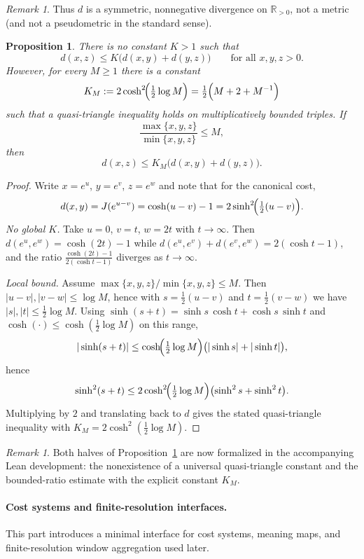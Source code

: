 \documentclass[11pt,reqno]{amsart}
\theoremstyle{plain}
\newtheorem{proposition}[theorem]{Proposition}
\theoremstyle{definition}
\theoremstyle{remark}
\newtheorem{remark}[theorem]{Remark} %
\newcommand{\Jcost}{J}
\newcommand{\RR}{\mathbb{R}}
\newcommand{\1}{\mathbf{1}}
\newcommand{\paperadd}[1]{{\color{paperblue}#1}}
\begin{document}
\begin{remark}
Thus $d$ is a symmetric, nonnegative divergence on $\RR_{>0}$, not a
metric (and not a pseudometric in the standard sense).
\end{remark}

\begin{proposition}\label{prop:quasi-triangle}
There is no constant $K>1$ such that
\[
d(x,z)\le K\bigl(d(x,y)+d(y,z)\bigr)\qquad\text{for all }x,y,z>0.
\]
However, for every $M\ge1$ there is a constant
\[
K_M:=2\cosh^2\!\Bigl(\tfrac12\log M\Bigr)=\tfrac12\Bigl(M+2+M^{-1}\Bigr)
\]
such that a quasi-triangle inequality holds on multiplicatively bounded triples.
If
\[
\frac{\max\{x,y,z\}}{\min\{x,y,z\}}\le M,
\]
then
\[
d(x,z)\le K_M\bigl(d(x,y)+d(y,z)\bigr).
\]
\end{proposition}

\begin{proof}
Write $x=e^{u}$, $y=e^{v}$, $z=e^{w}$ and note that for the canonical cost,
\[
d(x,y)=\Jcost(e^{u-v})=\cosh(u-v)-1=2\sinh^2\!\Bigl(\tfrac12(u-v)\Bigr).
\]
\emph{No global $K$.}  Take $u=0$, $v=t$, $w=2t$ with $t\to\infty$. Then
$d(e^{u},e^{w})=\cosh(2t)-1$ while $d(e^{u},e^{v})+d(e^{v},e^{w})=2(\cosh t-1)$, and the ratio
$\frac{\cosh(2t)-1}{2(\cosh t-1)}$ diverges as $t\to\infty$.

\emph{Local bound.}  Assume $\max\{x,y,z\}/\min\{x,y,z\}\le M$. Then
$|u-v|,|v-w|\le \log M$, hence with $s=\tfrac12(u-v)$ and $t=\tfrac12(v-w)$ we have $|s|,|t|\le \tfrac12\log M$.
Using $\sinh(s+t)=\sinh s\,\cosh t+\cosh s\,\sinh t$ and $\cosh(\cdot)\le \cosh(\tfrac12\log M)$ on this range,
\[
|\sinh(s+t)|\le \cosh\!\Bigl(\tfrac12\log M\Bigr)\bigl(|\sinh s|+|\sinh t|\bigr),
\]
hence
\[
\sinh^2(s+t)\le 2\cosh^2\!\Bigl(\tfrac12\log M\Bigr)\bigl(\sinh^2 s+\sinh^2 t\bigr).
\]
Multiplying by $2$ and translating back to $d$ gives the stated quasi-triangle inequality with $K_M=2\cosh^2(\tfrac12\log M)$.
\end{proof}

\begin{remark}
\paperadd{Both halves of Proposition~\ref{prop:quasi-triangle} are now formalized in the accompanying Lean development: the nonexistence of a universal quasi-triangle constant and the bounded-ratio estimate with the explicit constant \(K_M\).}
\end{remark}


\paragraph{\paperadd{Cost systems and finite-resolution interfaces.}}\label{sec:cost-systems}
This \paperadd{part} introduces a minimal interface for cost systems, meaning maps, and finite-resolution window aggregation used later.
\end{document}
